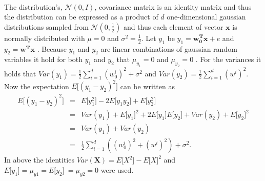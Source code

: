 \documentclass[article,11pt]{article}
\begin{document}
\\
The distribution's, $\mathcal{N}(0, I)$, covariance matrix is an identity matrix
and thus the distribution can be expressed as a product of $d$ one-dimensional
gaussian distributions sampled from $\mathcal{N}(0,\frac{1}{2})$ and thus each element of vector $\mathbf{x}$ is normally distributed with $\mu =0$ and $\sigma^2=\frac{1}{2}$. Let $y_1$ be $y_1 = \mathbf{w_0^T}\mathbf{x} + e$ and $y_2 = \mathbf{w^T}\mathbf{x}$ . Because $y_1$ and $y_2$ are linear combinations of gaussian random variables it hold for both $y_1$ and $y_2$ that $\mu_{y_1} = 0$ and  $\mu_{y_2} = 0$ . For the variances it holds that $Var(y_1) = \frac{1}{2}\sum_{i=1}^d(w_0^i)^2 + \sigma^2$ and  $Var(y_2) = \frac{1}{2}\sum_{i=1}^d(w^i)^2$. Now the expectation $E\lbrack(y_1-y_2)^2\rbrack$ can be written as
\begin{eqnarray}
  E\lbrack(y_1-y_2)^2\rbrack &=& E\lbrack y_1^2\rbrack -2E\lbrack y_1y_2\rbrack + E\lbrack y_2^2\rbrack\\
  &=& Var(y_1) + E\lbrack y_1\rbrack^2 + 2E\lbrack y_1\rbrack E\lbrack y_2\rbrack + Var(y_2) + E\lbrack y_2\rbrack^2\\
  &=& Var(y_1) + Var(y_2)\\
  &=& \frac{1}{2}\sum_{i=1}^d\left((w_0^i)^2 + (w^i)^2\right)+\sigma^2.
  \label{eq:expectation_value}
\end{eqnarray}
In above the identities $Var(\mathbf{X}) = E\lbrack X^2\rbrack-E\lbrack X\rbrack^2$  and $E\lbrack y_1\rbrack = \mu_{y1} = E\lbrack y_2\rbrack\ = \mu_{y2} = 0$ were used.
\end{document}
